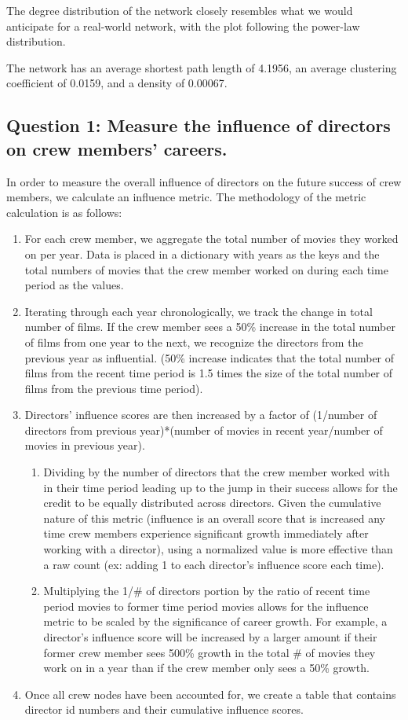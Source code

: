 \documentclass[12pt]{article}
\begin{document}
The degree distribution of the network closely resembles what we would anticipate for a real-world network, with the plot following the power-law distribution. 

The network has an average shortest path length of 4.1956, an average clustering coefficient of 0.0159, and a density of 0.00067.




\subsection*{Question 1: Measure the influence of directors on crew members' careers.}

In order to measure the overall influence of directors on the future success of crew members, we calculate an influence metric. The methodology of the metric calculation is as follows:
\begin{enumerate}
    \item For each crew member, we aggregate the total number of movies they worked on per year. Data is placed in a dictionary with years as the keys and the total numbers of movies that the crew member worked on during each time period as the values.
    \item Iterating through each year chronologically, we track the change in total number of films. If the crew member sees a 50\% increase in the total number of films from one year to the next, we recognize the directors from the previous year as influential. (50\% increase indicates that the total number of films from the recent time period is 1.5 times the size of the total number of films from the previous time period).
    \item Directors' influence scores are then increased by a factor of (1/number of directors from previous year)*(number of movies in recent year/number of movies in previous year). 
    \begin{enumerate}
        \item Dividing by the number of directors that the crew member worked with in their time period leading up to the jump in their success allows for the credit to be equally distributed across directors. Given the cumulative nature of this metric (influence is an overall score that is increased any time crew members experience significant growth immediately after working with a director), using a normalized value is more effective than a raw count (ex: adding 1 to each director's influence score each time).
        \item Multiplying the 1/\# of directors portion by the ratio of recent time period movies to former time period movies allows for the influence metric to be scaled by the significance of career growth. For example, a director's influence score will be increased by a larger amount if their former crew member sees 500\% growth in the total \# of movies they work on in a year than if the crew member only sees a 50\% growth. 
    \end{enumerate}
\item Once all crew nodes have been accounted for, we create a table that contains director id numbers and their cumulative influence scores. 
\end{enumerate}
\end{document}
